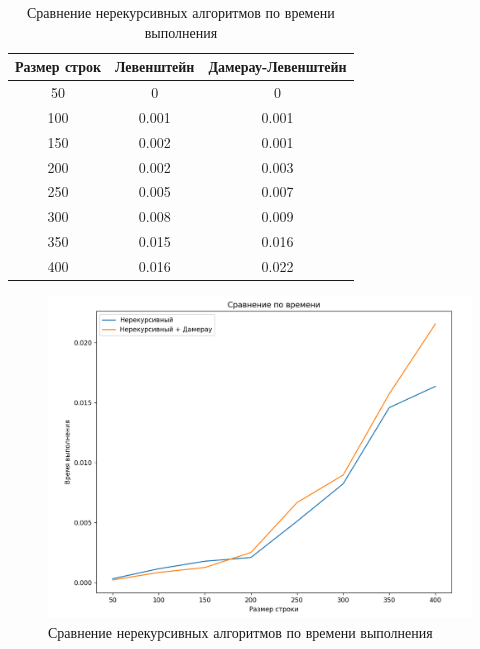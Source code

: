 \documentclass{article}
\begin{document}
\begin{table}[h]
	\begin{center}
	\caption{\label{tbl:time_cmp} Сравнение нерекурсивных алгоритмов по времени выполнения}
	\begin{tabular}{|c|c|c|}
		\hline
		Размер строк & Левенштейн & Дамерау-Левенштейн
		\\ \hline
		50 & 0 & 0
		\\ \hline
		100 & 0.001 & 0.001
		\\ \hline
		150 & 0.002 & 0.001
		\\ \hline
		200 & 0.002 & 0.003
		\\ \hline
		250 & 0.005 & 0.007
		\\ \hline
		300 & 0.008 & 0.009
		\\ \hline
		350 & 0.015 & 0.016
		\\ \hline
		400 & 0.016 & 0.022
		\\ \hline
	\end{tabular}
	\end{center}
\end{table}

\clearpage\begin{figure}[h]
	\centering
	\includegraphics[scale=0.7]{tools/Screenshot_2.png}
	\caption{Сравнение нерекурсивных алгоритмов по времени выполнения}
\end{figure}
\end{document}
